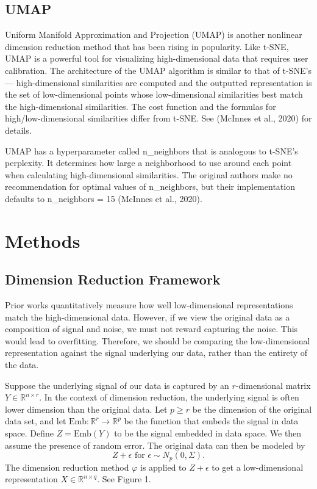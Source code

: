 \documentclass[webpdf,modern,large,namedate]{oup-authoring-template}
\theoremstyle{thmstyleone}%
\theoremstyle{thmstyletwo}%
\theoremstyle{thmstylethree}%
\begin{document}
\subsection{UMAP}
Uniform Manifold Approximation and Projection (UMAP) is another nonlinear dimension reduction method that has been rising in popularity. Like t-SNE, UMAP is a powerful tool for visualizing high-dimensional data that requires user calibration. The architecture of the UMAP algorithm is similar to that of t-SNE's --- high-dimensional similarities are computed and the outputted representation is the set of low-dimensional points whose low-dimensional similarities best match the high-dimensional similarities. The cost function and the formulas for high/low-dimensional similarities differ from t-SNE. See (McInnes et al., 2020) for details.

UMAP has a hyperparameter called n\_neighbors that is analogous to t-SNE's perplexity. It determines how large a neighborhood to use around each point when calculating high-dimensional similarities. The original authors make no recommendation for optimal values of n\_neighbors, but their implementation defaults to n\_neighbors = 15 (McInnes et al., 2020).

\section{Methods}

\subsection{Dimension Reduction Framework}
Prior works quantitatively measure how well low-dimensional representations match the high-dimensional data. However, if we view the original data as a composition of signal and noise, we must not reward capturing the noise. This would lead to overfitting. Therefore, we should be comparing the low-dimensional representation against the signal underlying our data, rather than the entirety of the data.

Suppose the underlying signal of our data is captured by an $r$-dimensional matrix $Y \in \mathbb{R}^{n \times r}$. In the context of dimension reduction, the underlying signal is often lower dimension than the original data. Let $p \geq r$ be the dimension of the original data set, and let $\textrm{Emb}:\mathbb{R}^r \to \mathbb{R}^p$ be the function that embeds the signal in data space. Define $Z = \textrm{Emb}(Y)$ to be the signal embedded in data space. We then assume the presence of random error. The original data can then be modeled by $$Z + \epsilon \textrm{ for } \epsilon \sim N_p(0, \Sigma).$$ The dimension reduction method $\varphi$ is applied to $Z + \epsilon$ to get a low-dimensional representation $X \in \mathbb{R}^{n \times q}$. See Figure 1.
\end{document}
